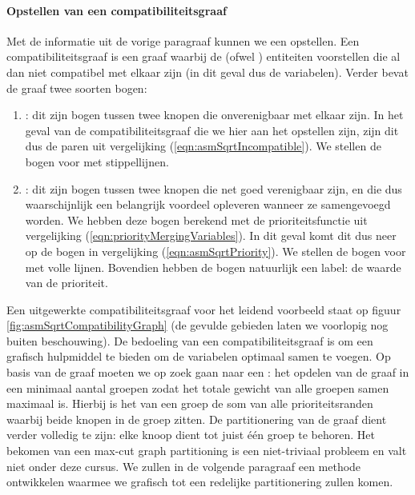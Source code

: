 \paragraph{Opstellen van een compatibiliteitsgraaf}
Met de informatie uit de vorige paragraaf kunnen we een  opstellen. Een compatibiliteitsgraaf is een graaf waarbij de  (ofwel ) entiteiten voorstellen die al dan niet compatibel met elkaar zijn (in dit geval dus de variabelen). Verder bevat de graaf twee soorten bogen:
\begin{enumerate}
 \item {}: dit zijn bogen tussen twee knopen die onverenigbaar met elkaar zijn. In het geval van de compatibiliteitsgraaf die we hier aan het opstellen zijn, zijn dit dus de paren uit vergelijking (\ref{eqn:asmSqrtIncompatible}). We stellen de bogen voor met stippellijnen.
 \item {}: dit zijn bogen tussen twee knopen die net goed verenigbaar zijn, en die dus waarschijnlijk een belangrijk voordeel opleveren wanneer ze samengevoegd worden. We hebben deze bogen berekend met de prioriteitsfunctie uit vergelijking (\ref{eqn:priorityMergingVariables}). In dit geval komt dit dus neer op de bogen in vergelijking (\ref{eqn:asmSqrtPriority}). We stellen de bogen voor met volle lijnen. Bovendien hebben de bogen natuurlijk een label: de waarde van de prioriteit.
\end{enumerate}
Een uitgewerkte compatibiliteitsgraaf voor het leidend voorbeeld staat op figuur \ref{fig:asmSqrtCompatibilityGraph} (de gevulde gebieden laten we voorlopig nog buiten beschouwing). De bedoeling van een compatibiliteitsgraaf is om een grafisch hulpmiddel te bieden om de variabelen optimaal samen te voegen. Op basis van de graaf moeten we op zoek gaan naar een : het opdelen van de graaf in een minimaal aantal groepen zodat het totale gewicht van alle groepen samen maximaal is. Hierbij is het  van een groep de som van alle prioriteitsranden waarbij beide knopen in de groep zitten. De partitionering van de graaf dient verder volledig te zijn: elke knoop dient tot juist \'e\'en groep te behoren. Het bekomen van een max-cut graph partitioning is een niet-triviaal probleem en valt niet onder deze cursus. We zullen in de volgende paragraaf een methode ontwikkelen waarmee we grafisch tot een redelijke partitionering zullen komen.
